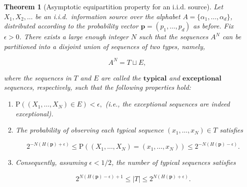 \documentclass[11pt]{report}
\theoremstyle{plain}
\newtheorem{thm}{Theorem}[chapter]
\theoremstyle{definition}
\begin{document}
\begin{thm}[Asymptotic equipartition property for an i.i.d. source]
Let $X_1,X_2,\ldots$ be an i.i.d.\ information source
over the alphabet $A=\{\alpha_1,\ldots,\alpha_d\}$,
distributed according to the probability vector
$\mathbf{p}=(p_1,\ldots,p_d)$ as before. Fix
$\epsilon>0$. There exists a large enough integer $N$
such that the sequences $A^N$ can be partitioned into
a disjoint union of sequences of two types, namely,

\[
A^N = T \sqcup E,
\]

\noindent where the sequences in $T$ and $E$ are called the
$\textbf{typical}$ and $\textbf{exceptional}$
sequences, respectively, such that the following
properties hold:

\begin{enumerate}[label=\arabic*.]
\item $\mathrm{P}((X_1,\ldots,X_N) \in E) < \epsilon,$
(i.e., the exceptional sequences are indeed
exceptional).

\item The probability of observing each typical sequence
$(x_1,\ldots,x_N)\in T$ satisfies

\begin{equation*} \tag{26}\label{eq:aep-prob-bound}
2^{-N\left(H(\mathbf{p}) + \epsilon\right)} \le
\mathrm{P}((X_1,\ldots,X_N)=(x_1,\ldots,x_N)) \le
2^{-N\left(H(\mathbf{p}) - \epsilon\right)}.
\end{equation*}

\item Consequently, assuming $\epsilon<1/2$, the number of
typical sequences satisfies

\begin{equation*} \tag{27}\label{eq:aep-numtypical}
2^{N (H(\mathbf{p})-\epsilon)+1} \le |T| \le 2^{N (H(\mathbf{p})+\epsilon)}.
\end{equation*}
\end{enumerate}

\end{thm}
\end{document}
